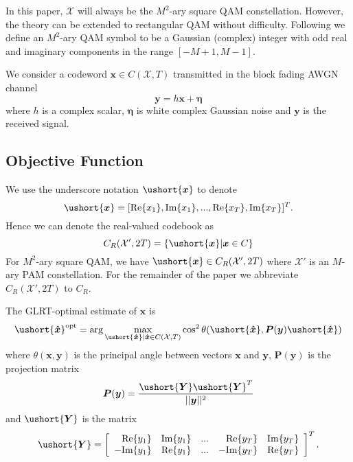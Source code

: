 \documentclass[conference]{IEEEtran}
\newcommand{\uY}{\ushort{\bm{Y}}}
\newcommand{\ux}{\ushort{\bm{x}}}
\newcommand{\uhx}{\ushort{\bm{\hat{x}}}}
\begin{document}
In this paper, $\mathcal{X}$ will always be the $M^2$-ary square QAM constellation.  However, the theory can be extended to rectangular QAM without difficulty.  Following \cite{Ryan2007} we define an $M^2$-ary QAM symbol to be a Gaussian (complex) integer with odd real and imaginary components in the range $[-M+1,M-1]$.

We consider a codeword $\bm{x} \in C(\mathcal{X}, T )$ transmitted in the block fading AWGN channel
\begin{equation}
\bm{y} = h\bm{x} + \bm{\eta}
\end{equation}
where $h$ is a complex scalar, $\bm{\eta}$ is white complex Gaussian noise and $\bm{y}$ is the received signal.

\subsection{Objective Function} \label{obj_fn}

We use the underscore notation $\ux$ to denote
\begin{equation} \label{eq_underline_operator}
\ux = [ \text{Re}\{x_1\}, \text{Im}\{x_1\}, . . . , \text{Re}\{x_T\},  \text{Im}\{x_T\}]^T.
\end{equation}
Hence we can denote the real-valued codebook as 
\[
C_R(\mathcal{X}', 2T) = \{\ux | \bm{x} \in C \}
\]
For $M^2$-ary square QAM, we have $\ux \in C_R(\mathcal{X}', 2T)$ where $\mathcal{X}'$ is an $M$-ary PAM constellation.  For the remainder of the paper we abbreviate $C_R(\mathcal{X}', 2T)$ to $C_R$.

The GLRT-optimal estimate of $\bm{x}$ is
\begin{equation}
\uhx^{\text{opt}} = \arg\max_{\uhx|\bm{\hat{x}} \in C(\mathcal{X}, T )} \cos^2{\theta(\uhx,\bm{P}(\bm{y})\uhx) }
\label{eq_objfn}
\end{equation}
where $\theta(\bm{x},\bm{y})$ is the principal angle between vectors $\bm{x}$ and $\bm{y}$, $\bm{P}(\bm{y})$ is the projection matrix
\[
\bm{P}(\bm{y}) = \frac{\uY\uY^T}{||\bm{y}||^2}
\]
and $\uY$ is the matrix
\begin{equation} \label{eq_Y}
\uY = \left[ \begin{array}{rrrrr}
\text{Re}\{y_1\} & \text{Im}\{y_1\} & . . .  & \text{Re}\{y_T\} &  \text{Im}\{y_T\} \\
-\text{Im}\{y_1\} & \text{Re}\{y_1\} & . . .  & -\text{Im}\{y_T\} &  \text{Re}\{y_T\} 
\end{array} \right]^T.
\end{equation}
\end{document}
